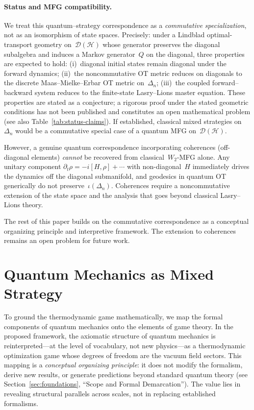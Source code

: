 \documentclass[12pt,a4paper]{article}
\theoremstyle{remark}
\begin{document}
\paragraph{Status and MFG compatibility.}
We treat this quantum--strategy correspondence as a \emph{commutative specialization}, not as an isomorphism of state spaces. Precisely: under a Lindblad optimal-transport geometry on~$\mathcal{D}(\mathcal{H})$ whose generator preserves the diagonal subalgebra and induces a Markov generator~$Q$ on the diagonal, three properties are expected to hold: (i)~diagonal initial states remain diagonal under the forward dynamics; (ii)~the noncommutative OT metric reduces on diagonals to the discrete Maas--Mielke--Erbar OT metric on~$\Delta_n$; (iii)~the coupled forward--backward system reduces to the finite-state Lasry--Lions master equation. These properties are stated as a conjecture; a rigorous proof under the stated geometric conditions has not been published and constitutes an open mathematical problem (see also Table~\ref{tab:status-claims}). If established, classical mixed strategies on~$\Delta_n$ would be a commutative special case of a quantum MFG on~$\mathcal{D}(\mathcal{H})$.

However, a genuine quantum correspondence incorporating coherences (off-diagonal elements) \emph{cannot} be recovered from classical~$W_2$-MFG alone. Any unitary component $\partial_t \rho = -i[H, \rho] + \cdots$ with non-diagonal~$H$ immediately drives the dynamics off the diagonal submanifold, and geodesics in quantum OT generically do not preserve~$\iota(\Delta_n)$. Coherences require a noncommutative extension of the state space and the analysis that goes beyond classical Lasry--Lions theory.

The rest of this paper builds on the commutative correspondence as a conceptual organizing principle and interpretive framework. The extension to coherences remains an open problem for future work.

\section{Quantum Mechanics as Mixed Strategy}
\label{sec:quantum}

To ground the thermodynamic game mathematically, we map the formal components of quantum mechanics onto the elements of game theory. In the proposed framework, the axiomatic structure of quantum mechanics is reinterpreted---at the level of vocabulary, not new physics---as a thermodynamic optimization game whose degrees of freedom are the vacuum field sectors. This mapping is a \emph{conceptual organizing principle}: it does not modify the formalism, derive new results, or generate predictions beyond standard quantum theory (see Section~\ref{sec:foundations}, ``Scope and Formal Demarcation''). The value lies in revealing structural parallels across scales, not in replacing established formalisms.
\end{document}
